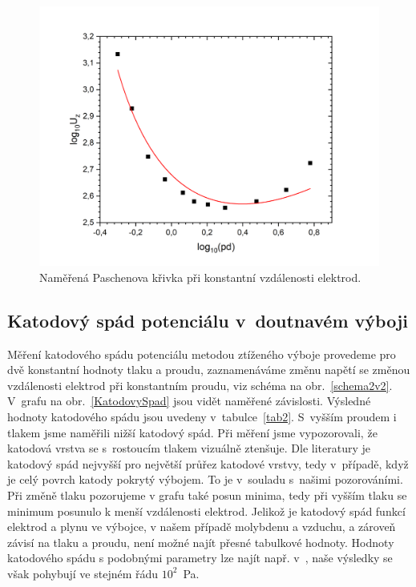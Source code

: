 \documentclass[a4paper,12pt]{article}
\begin{document}
\begin{figure}[h!]
	\centering
	\includegraphics[width=150mm]{dfixed.png}
	\caption{Naměřená Paschenova křivka při konstantní vzdálenosti elektrod.}
	\label{dfixed}
\end{figure}

\clearpage
\subsection{Katodový spád potenciálu v~doutnavém výboji}
Měření katodového spádu potenciálu metodou ztíženého výboje provedeme pro dvě konstantní hodnoty tlaku a proudu, 
zaznamenáváme změnu napětí se změnou vzdálenosti elektrod při konstantním 
proudu, viz schéma na obr.~\ref{schema2v2}. V~grafu na 
obr.~\ref{KatodovySpad} jsou vidět naměřené závislosti. Výsledné hodnoty 
katodového spádu jsou uvedeny v~tabulce~\ref{tab2}. S~vyšším proudem i tlakem
jsme naměřili nižší katodový spád. Při měření jsme vypozorovali, 
že katodová vrstva se s~rostoucím tlakem vizuálně ztenšuje. Dle literatury je 
katodový spád nejvyšší pro největší průřez katodové vrstvy, tedy v~případě, 
když je 
celý povrch katody pokrytý výbojem. To je v~souladu s~našimi pozorováními. 
Při změně tlaku pozorujeme v grafu také posun minima, tedy při vyšším tlaku se 
minimum posunulo k menší vzdálenosti elektrod. Jelikož je katodový spád funkcí 
elektrod a plynu ve výbojce, v našem případě molybdenu a vzduchu, a zároveň 
závisí na tlaku a proudu, není možné najít přesné tabulkové hodnoty. Hodnoty 
katodového spádu s podobnými parametry lze najít např. v~\cite{cathode}, naše 
výsledky se však pohybují ve stejném řádu $10^2$~Pa.
\end{document}
